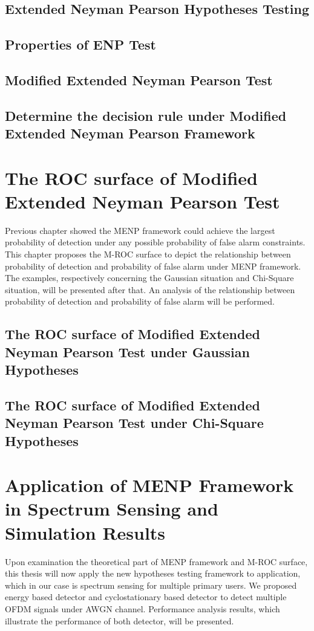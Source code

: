 \documentclass{article}
\begin{document}
\begin{spacing}{2.0}
\subsection{Extended Neyman Pearson Hypotheses Testing}
\subsection{Properties of ENP Test}
\subsection{Modified Extended Neyman Pearson Test}
\subsection{Determine the decision rule under Modified Extended Neyman Pearson Framework}
\newpage
\section{The ROC surface of Modified Extended Neyman Pearson Test}
Previous chapter showed the MENP framework could achieve the largest probability of detection under any possible probability of false alarm constraints.  This chapter proposes the M-ROC surface to depict the relationship between probability of detection and probability of false alarm under MENP framework. The examples, respectively concerning the Gaussian situation and Chi-Square situation, will be presented after that. An analysis of the relationship between probability of detection and probability of false alarm will be performed.  
\subsection{The ROC surface of Modified Extended Neyman Pearson Test under Gaussian Hypotheses}
\subsection{The ROC surface of Modified Extended Neyman Pearson Test under Chi-Square Hypotheses}
\newpage
\section{Application of MENP Framework in Spectrum Sensing and Simulation Results}
Upon examination the theoretical part of MENP framework and M-ROC surface, this thesis will now apply the new hypotheses testing framework to application, which in our case is spectrum sensing for multiple primary users. We proposed energy based detector and cyclostationary based detector to detect multiple OFDM signals under AWGN channel. Performance analysis results, which illustrate the performance of both detector, will be presented.   

\end{spacing}
\end{document}
